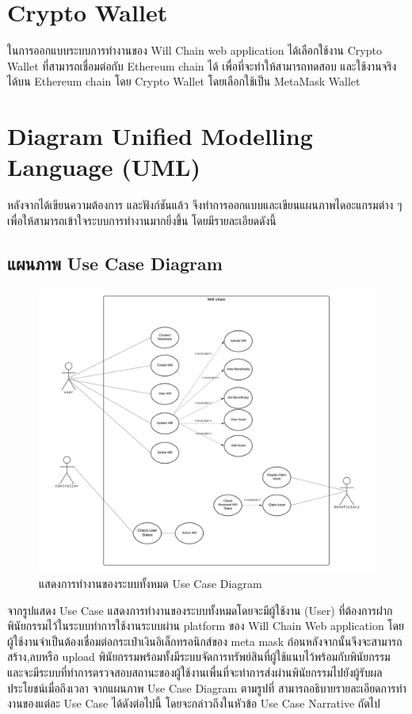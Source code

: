 \documentclass[12pt,oneside,openright,a4paper]{cpe-thai-project}
\begin{document}
\section{Crypto Wallet}
\tab ในการออกแบบระบบการทํางานของ Will Chain web application ได้เลือกใช้งาน Crypto Wallet ที่สามารถเชื่อมต่อกับ
Ethereum chain ได้ เพื่อที่จะทําให้สามารถทดสอบ และใช้งานจริงได้บน Ethereum chain โดย Crypto Wallet โดยเลือกใช้เป็น MetaMask Wallet

\section{Diagram Unified Modelling Language (UML)}
\tab หลังจากได้เขียนความต้องการ และฟังก์ชันแล้ว จึงทำการออกแบบและเขียนแผนภาพไดอะแกรมต่าง ๆ เพื่อให้สามารถเข้าใจระบบการทำงานมากยิ่งขึ้น โดยมีรายละเอียดดังนี้

\subsection{แผนภาพ Use Case Diagram}
	\begin{figure}[!htb]
		\centering
		\includegraphics[scale=0.5]{UseCaseDiagram}
		\caption{แสดงการทำงานของระบบทั้งหมด Use Case Diagram}
	\end{figure}
\FloatBarrier

\tab จากรูปแสดง Use Case แสดงการทำงานของระบบทั้งหมดโดยจะมีผู้ใช้งาน (User) ที่ต้องการฝากพินัยกรรมไว้ในระบบทำการใช้งานระบบผ่าน platform ของ Will Chain Web application  โดยผู้ใช้งานจำเป็นต้องเชื่อมต่อกระเป๋าเงินอิเล็กทรอนิกส์ของ meta mask ก่อนหลังจากนั้นจึงจะสามารถ สร้าง,ลบหรือ upload พินัยกรรมพร้อมทั้งมีระบบจัดการทรัพย์สินที่ผู้ใช้แนบไว้พร้อมกับพินัยกรรม และจะมีระบบที่ทำการตรวจสอบสถานะของผู้ใช้งานเพื่นที่จะทำการส่งผ่านพินัยกรรมไปยังผู้รับผลประโยชน์เมื่อถึงเวลา   จากแผนภาพ Use Case Diagram ตามรูปที่ สามารถอธิบายรายละเอียดการทํา งานของแต่ละ Use Case ได้ดังต่อไปนี้ โดยจะกล่าวถึงในหัวข้อ Use Case Narrative ถัดไป
\clearpage
\end{document}

